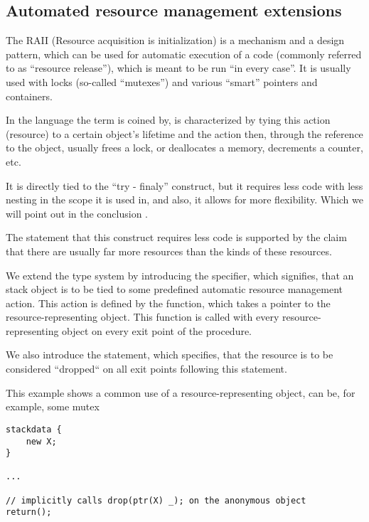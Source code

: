 \subsection{Automated resource management extensions}
\label{RAII}




The RAII (Resource acquisition is initialization) is a mechanism and a design pattern, which can be used for automatic execution of a code (commonly referred to as ``resource release''), which is meant to be run ``in every case''. It is usually used with locks (so-called ``mutexes'') and various ``smart'' pointers and containers.

In the language the term is coined by, is characterized by tying this action (resource) to a certain object's lifetime and the action then, through the reference to the object, usually frees a lock, or deallocates a memory, decrements a counter, etc.

It is directly tied to the ``try - finaly''  construct, but it requires less code with less nesting in the scope it is used in, and also, it allows for more flexibility. Which we will point out in the conclusion .

The statement that this construct requires less code is supported by the claim that there are usually far more resources than the kinds of these resources.

We extend the type system by introducing the  specifier, which signifies, that an stack object is to be tied to some predefined automatic resource management action. This action is defined by the  function, which takes a pointer to the resource-representing object. This function is called with every resource-representing object on every exit point of the procedure.

We also introduce the  statement, which specifies, that the resource is to be considered ``dropped`` on all exit points following this statement.

\begin{ex}
    This example shows a common use of a resource-representing object,  can be, for example, some mutex
    \begin{lstlisting}
stackdata {
    new X;
}

...

// implicitly calls drop(ptr(X) _); on the anonymous object
return();
    \end{lstlisting}
\end{ex}

